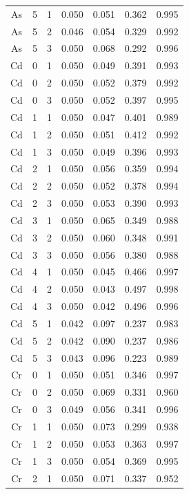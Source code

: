 \documentclass[ms, hidelinks]{uncgdissertationexp}
\theoremstyle{plain}
\theoremstyle{definition}
\theoremstyle{remark}
\begin{document}
\begin{longtable}{ccccccc}
As & 5 & 1 & 0.050 & 0.051 & 0.362 & 0.995\\
\rowcolor{gray!6}  As & 5 & 2 & 0.046 & 0.054 & 0.329 & 0.992\\
As & 5 & 3 & 0.050 & 0.068 & 0.292 & 0.996\\
\rowcolor{gray!6}  Cd & 0 & 1 & 0.050 & 0.049 & 0.391 & 0.993\\
Cd & 0 & 2 & 0.050 & 0.052 & 0.379 & 0.992\\
\rowcolor{gray!6}  Cd & 0 & 3 & 0.050 & 0.052 & 0.397 & 0.995\\
Cd & 1 & 1 & 0.050 & 0.047 & 0.401 & 0.989\\
\rowcolor{gray!6}  Cd & 1 & 2 & 0.050 & 0.051 & 0.412 & 0.992\\
Cd & 1 & 3 & 0.050 & 0.049 & 0.396 & 0.993\\
\rowcolor{gray!6}  Cd & 2 & 1 & 0.050 & 0.056 & 0.359 & 0.994\\
Cd & 2 & 2 & 0.050 & 0.052 & 0.378 & 0.994\\
\rowcolor{gray!6}  Cd & 2 & 3 & 0.050 & 0.053 & 0.390 & 0.993\\
Cd & 3 & 1 & 0.050 & 0.065 & 0.349 & 0.988\\
\rowcolor{gray!6}  Cd & 3 & 2 & 0.050 & 0.060 & 0.348 & 0.991\\
Cd & 3 & 3 & 0.050 & 0.056 & 0.380 & 0.988\\
\rowcolor{gray!6}  Cd & 4 & 1 & 0.050 & 0.045 & 0.466 & 0.997\\
Cd & 4 & 2 & 0.050 & 0.043 & 0.497 & 0.998\\
\rowcolor{gray!6}  Cd & 4 & 3 & 0.050 & 0.042 & 0.496 & 0.996\\
Cd & 5 & 1 & 0.042 & 0.097 & 0.237 & 0.983\\
\rowcolor{gray!6}  Cd & 5 & 2 & 0.042 & 0.090 & 0.237 & 0.986\\
Cd & 5 & 3 & 0.043 & 0.096 & 0.223 & 0.989\\
\rowcolor{gray!6}  Cr & 0 & 1 & 0.050 & 0.051 & 0.346 & 0.997\\
Cr & 0 & 2 & 0.050 & 0.069 & 0.331 & 0.960\\
\rowcolor{gray!6}  Cr & 0 & 3 & 0.049 & 0.056 & 0.341 & 0.996\\
Cr & 1 & 1 & 0.050 & 0.073 & 0.299 & 0.938\\
\rowcolor{gray!6}  Cr & 1 & 2 & 0.050 & 0.053 & 0.363 & 0.997\\
Cr & 1 & 3 & 0.050 & 0.054 & 0.369 & 0.995\\
\rowcolor{gray!6}  Cr & 2 & 1 & 0.050 & 0.071 & 0.337 & 0.952\\

\end{longtable}
\end{document}
